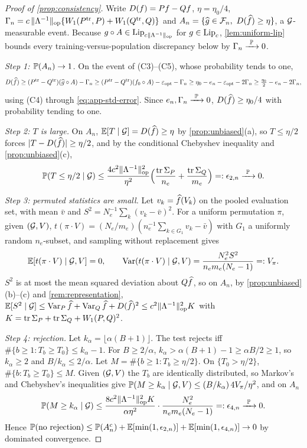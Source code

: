 \begin{proof}[Proof of \cref{prop:consistency}]
Write $D(f)=Pf-Qf$, $\eta=\eta_0/4$,
$\Gamma_n=c\,\lVert\Lambda^{-1}\rVert_{\mathrm{op}}\{W_{1}(P^{\mathrm{tr}},P)+W_{1}(Q^{\mathrm{tr}},Q)\}$ and
$A_n=\{\ghat\in\mathcal F_n,\ \Dcrit(\fhat)\ge\eta\}$, a $\mathcal{G}$-measurable event. Because
$g\circ A\in\operatorname{Lip}_{c\lVert\Lambda^{-1}\rVert_{\mathrm{op}}}$ for $g\in\operatorname{Lip}_c$, \cref{lem:uniform-lip}
bounds every training-versus-population discrepancy below by $\Gamma_n\xrightarrow{\ \mathbb{P}\ }0$.

\emph{Step 1: $\mathbb{P}(A_n)\to1$.} On the event of (C3)--(C5), whose probability tends to one,
\[
  D(\widehat{f})\ge(P^{\mathrm{tr}}-Q^{\mathrm{tr}})(\widehat{g}\circ A)-\Gamma_n
  \ge(P^{\mathrm{tr}}-Q^{\mathrm{tr}})(f_0\circ A)-\varepsilon_{\mathrm{opt}}-\Gamma_n
  \ge\eta_0-e_n-\varepsilon_{\mathrm{opt}}-2\Gamma_n\ge\tfrac{\eta_0}2-e_n-2\Gamma_n ,
\]
using (C4) through \eqref{eq:app-std-error}. Since $e_n,\Gamma_n\xrightarrow{\ \mathbb{P}\ }0$,
$D(\widehat{f})\ge\eta_0/4$ with probability tending to one.

\emph{Step 2: $T$ is large.} On $A_n$, $\mathbb{E}[T\mid\mathcal{G}]=D(\widehat{f})\ge\eta$ by
\cref{prop:unbiased}(a), so $T\le\eta/2$ forces $\lvert T-D(\widehat{f})\rvert\ge\eta/2$, and by the
conditional Chebyshev inequality and \cref{prop:unbiased}(c),
\[
  \mathbb{P}(T\le\eta/2\mid\mathcal{G})\le\frac{4c^2\lVert\Lambda^{-1}\rVert_{\mathrm{op}}^2}{\eta^2}
  \Big(\frac{\operatorname{tr}\Sigma_P}{n_e}+\frac{\operatorname{tr}\Sigma_Q}{m_e}\Big)=:\epsilon_{2,n}\xrightarrow{\ \mathbb{P}\ }0 .
\]

\emph{Step 3: permuted statistics are small.} Let $v_k=\widehat{f}(V_k)$ on the pooled evaluation set,
with mean $\bar v$ and $S^2=N_e^{-1}\sum_k(v_k-\bar v)^2$. For a uniform permutation $\pi$, given
$(\mathcal{G},V)$, $t(\pi\cdot V)=(N_e/m_e)(n_e^{-1}\sum_{k\in G_1}v_k-\bar v)$ with $G_1$ a uniformly
random $n_e$-subset, and sampling without replacement gives
\[
  \mathbb{E}[t(\pi\cdot V)\mid\mathcal{G},V]=0,\qquad
  \operatorname{Var}(t(\pi\cdot V)\mid\mathcal{G},V)=\frac{N_e^2S^2}{n_em_e(N_e-1)}=:V_\pi .
\]
$S^2$ is at most the mean squared deviation about $Q\widehat{f}$, so on $A_n$, by
\cref{prop:unbiased}(b)--(c) and \cref{rem:representation},
$\mathbb{E}[S^2\mid\mathcal{G}]\le\operatorname{Var}_P\widehat{f}+\operatorname{Var}_Q\widehat{f}+D(\widehat{f})^2\le c^2\lVert\Lambda^{-1}\rVert_{\mathrm{op}}^2K$
with $K=\operatorname{tr}\Sigma_P+\operatorname{tr}\Sigma_Q+W_{1}(P,Q)^2$.

\emph{Step 4: rejection.} Let $k_\alpha=\lfloor\alpha(B+1)\rfloor$. The test rejects iff
$\#\{b\ge1:T_b\ge T_0\}\le k_\alpha-1$. For $B\ge2/\alpha$, $k_\alpha>\alpha(B+1)-1\ge\alpha B/2\ge1$,
so $k_\alpha\ge2$ and $B/k_\alpha\le2/\alpha$. Let $M=\#\{b\ge1:T_b\ge\eta/2\}$. On
$\{T_0>\eta/2\}$, $\#\{b:T_b\ge T_0\}\le M$. Given $(\mathcal{G},V)$ the $T_b$ are identically
distributed, so Markov's and Chebyshev's inequalities give
$\mathbb{P}(M\ge k_\alpha\mid\mathcal{G},V)\le(B/k_\alpha)\,4V_\pi/\eta^2$, and on $A_n$
\[
  \mathbb{P}(M\ge k_\alpha\mid\mathcal{G})\le\frac{8c^2\lVert\Lambda^{-1}\rVert_{\mathrm{op}}^2K}{\alpha\eta^2}\cdot
  \frac{N_e^2}{n_em_e(N_e-1)}=:\epsilon_{4,n}\xrightarrow{\ \mathbb{P}\ }0 .
\]
Hence $\mathbb{P}(\text{no rejection})\le\mathbb{P}(A_n^c)+\mathbb{E}[\min(1,\epsilon_{2,n})]+\mathbb{E}[\min(1,\epsilon_{4,n})]\to0$
by dominated convergence.
\end{proof}

